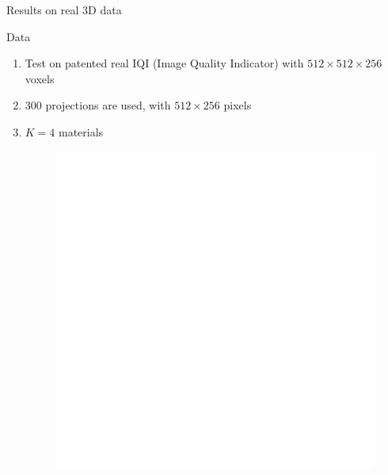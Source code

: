 \documentclass[latex]{beamer}
\begin{document}
\begin{frame}{Results on real 3D data}
\begin{block}{Data}
\begin{enumerate}
\item Test on patented real IQI (Image Quality Indicator) \cite{gay2016fantomeiqi} with $512 \times 512 \times 256$ voxels
\item $300$ projections are used, with $512 \times 256$ pixels
\item $K=4$ materials
\begin{figure}
\begin{minipage}[htb]{0.46\linewidth}
\centering
\includegraphics[scale=0.25]{volume_FDK2400projBas.png}
\end{minipage} \hfill
\begin{minipage}[htb]{0.46\linewidth}
\centering

\end{minipage}
\end{figure}
\end{enumerate}
\end{block}
\end{frame}
\end{document}
